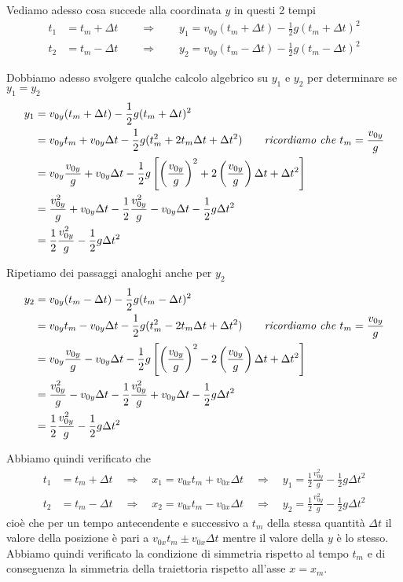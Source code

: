 \documentclass{article}
\begin{document}
Vediamo adesso cosa succede alla coordinata $y$ in questi 2 tempi
\begin{align}
  t_1 &= t_m + \Delta t \qquad \Rightarrow \qquad y_1 = v_{0y} (t_m + \Delta t) - \frac{1}{2}g(t_m + \Delta t)^2 \\
  t_2 &= t_m - \Delta t \qquad \Rightarrow \qquad y_2 = v_{0y} (t_m - \Delta t) - \frac{1}{2}g(t_m - \Delta t)^2
\end{align}

Dobbiamo adesso svolgere qualche calcolo algebrico su $y_1$ e $y_2$ per determinare se $y_1 = y_2$
\begin{align}
  y_1 &= v_{0y} (t_m + \Delta t) - \frac{1}{2}g(t_m + \Delta t)^2 \\
      &= v_{0y} t_m + v_{0y} \Delta t - \frac{1}{2}g (t_m^2 + 2 t_m \Delta t + \Delta t^2) \qquad \text{\textit{ricordiamo che $t_m = \frac{v_{0y}}{g}$}} \\
      &= v_{0y} \frac{v_{0y}}{g} + v_{0y} \Delta t - \frac{1}{2}g \left[\left(\frac{v_{0y}}{g}\right)^2 + 2 \left(\frac{v_{0y}}{g}\right) \Delta t + \Delta t^2\right] \\
      &= \frac{v_{0y}^2}{g} + v_{0y} \Delta t - \frac{1}{2} \frac{v_{0y}^2}{g} - v_{0y} \Delta t - \frac{1}{2}g \Delta t ^2 \\
      &= \frac{1}{2} \frac{v_{0y}^2}{g} - \frac{1}{2}g \Delta t ^2
\end{align}

Ripetiamo dei passaggi analoghi anche per $y_2$
\begin{align}
  y_2 &= v_{0y} (t_m - \Delta t) - \frac{1}{2}g(t_m - \Delta t)^2 \\
      &= v_{0y} t_m - v_{0y} \Delta t - \frac{1}{2}g (t_m^2 - 2 t_m \Delta t + \Delta t^2) \qquad \text{\textit{ricordiamo che $t_m = \frac{v_{0y}}{g}$}} \\
      &= v_{0y} \frac{v_{0y}}{g} - v_{0y} \Delta t - \frac{1}{2}g \left[\left(\frac{v_{0y}}{g}\right)^2 - 2 \left(\frac{v_{0y}}{g}\right) \Delta t + \Delta t^2\right] \\
      &= \frac{v_{0y}^2}{g} - v_{0y} \Delta t - \frac{1}{2} \frac{v_{0y}^2}{g} + v_{0y} \Delta t - \frac{1}{2}g \Delta t ^2 \\
      &= \frac{1}{2} \frac{v_{0y}^2}{g} - \frac{1}{2}g \Delta t ^2
\end{align}

Abbiamo quindi verificato che
\begin{align}
  t_1 &= t_m + \Delta t 
  \quad \Rightarrow \quad x_1 = v_{0x} t_m + v_{0x} \Delta t
  \quad \Rightarrow \quad y_1 = \frac{1}{2} \frac{v_{0y}^2}{g} - \frac{1}{2}g \Delta t ^2 \\
  t_2 &= t_m - \Delta t 
  \quad \Rightarrow \quad x_2 = v_{0x} t_m - v_{0x} \Delta t
  \quad \Rightarrow \quad y_2 = \frac{1}{2} \frac{v_{0y}^2}{g} - \frac{1}{2}g \Delta t ^2
\end{align}
cioè che per un tempo antecendente e successivo a $t_m$ della stessa quantità $\Delta t$ il valore della posizione è pari a $v_{0x}t_m \pm v_{0x} \Delta t$ mentre il valore della $y$ è lo stesso. Abbiamo quindi verificato la condizione di simmetria rispetto al tempo $t_m$ e di conseguenza la simmetria della traiettoria rispetto all'asse $x=x_m$. 
\end{document}
